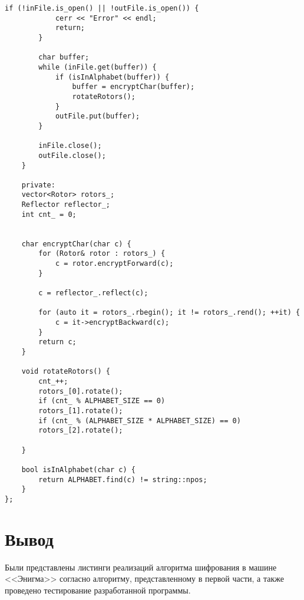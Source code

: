 \begin{center}
\begin{lstlisting}[label=lst:enigma1,caption=Реализация алгоритма шифрования машины <<Энигма>>]
		if (!inFile.is_open() || !outFile.is_open()) {
			cerr << "Error" << endl;
			return;
		}
		
		char buffer;
		while (inFile.get(buffer)) {
			if (isInAlphabet(buffer)) {
				buffer = encryptChar(buffer);
				rotateRotors();
			}
			outFile.put(buffer);
		}
		
		inFile.close();
		outFile.close();
	}
	
	private:
	vector<Rotor> rotors_;
	Reflector reflector_;
	int cnt_ = 0;
	

	char encryptChar(char c) {
		for (Rotor& rotor : rotors_) {
			c = rotor.encryptForward(c);
		}
		
		c = reflector_.reflect(c);
		
		for (auto it = rotors_.rbegin(); it != rotors_.rend(); ++it) {
			c = it->encryptBackward(c);
		}
		return c;
	}
	
	void rotateRotors() {
		cnt_++;
		rotors_[0].rotate();
		if (cnt_ % ALPHABET_SIZE == 0)
		rotors_[1].rotate();
		if (cnt_ % (ALPHABET_SIZE * ALPHABET_SIZE) == 0)
		rotors_[2].rotate();
		
	}
	
	bool isInAlphabet(char c) {
		return ALPHABET.find(c) != string::npos;
	}
};

\end{lstlisting}
\end{center}
\section*{Вывод}

Были представлены листинги реализаций алгоритма шифрования в машине <<Энигма>> согласно алгоритму, представленному в первой части, а также проведено тестирование разработанной программы.